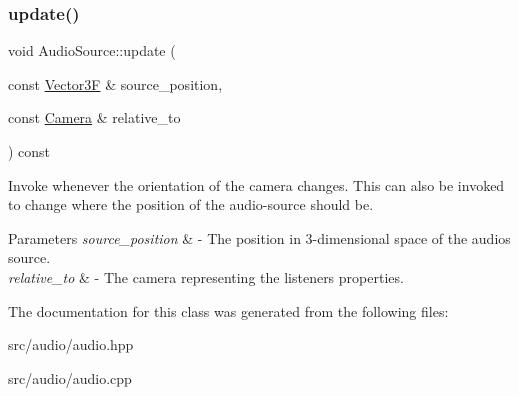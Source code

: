 \subsubsection{\texorpdfstring{update()}{update()}}
{\footnotesize\ttfamily void Audio\+Source\+::update (\begin{DoxyParamCaption}\item[{const \mbox{\hyperlink{class_vector3}{Vector3F}} \&}]{source\+\_\+position,  }\item[{const \mbox{\hyperlink{class_camera}{Camera}} \&}]{relative\+\_\+to }\end{DoxyParamCaption}) const}

Invoke whenever the orientation of the camera changes. This can also be invoked to change where the position of the audio-\/source should be. 
\begin{DoxyParams}{Parameters}
{\em source\+\_\+position} & -\/ The position in 3-\/dimensional space of the audio\textquotesingle{}s source. \\
\hline
{\em relative\+\_\+to} & -\/ The camera representing the listener\textquotesingle{}s properties. \\
\hline
\end{DoxyParams}


The documentation for this class was generated from the following files\+:\begin{DoxyCompactItemize}
\item 
src/audio/audio.\+hpp\item 
src/audio/audio.\+cpp\end{DoxyCompactItemize}
